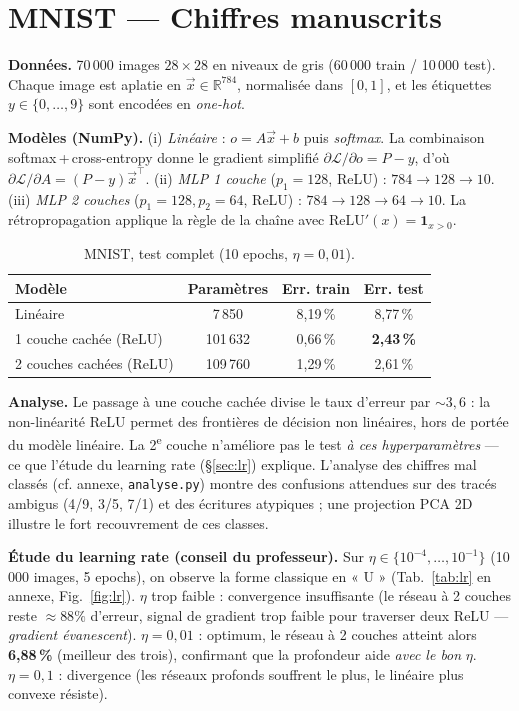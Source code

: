 \documentclass[11pt]{article}
\begin{document}
\section{MNIST --- Chiffres manuscrits}
\textbf{Données.} 70\,000 images $28\times28$ en niveaux de gris (60\,000 train / 10\,000 test).
Chaque image est aplatie en $\vec{x}\in\mathbb{R}^{784}$, normalisée dans $[0,1]$, et les étiquettes
$y\in\{0,\dots,9\}$ sont encodées en \emph{one-hot}.

\textbf{Modèles (NumPy).} (i) \emph{Linéaire} : $o=A\vec{x}+b$ puis \emph{softmax}. La combinaison
softmax\,+\,cross-entropy donne le gradient simplifié $\partial\mathcal{L}/\partial o = P-y$, d'où
$\partial\mathcal{L}/\partial A = (P-y)\vec{x}^{\top}$. (ii) \emph{MLP 1 couche} ($p_1=128$, ReLU) :
$784\!\to\!128\!\to\!10$. (iii) \emph{MLP 2 couches} ($p_1=128,p_2=64$, ReLU) :
$784\!\to\!128\!\to\!64\!\to\!10$. La rétropropagation applique la règle de la chaîne avec
$\mathrm{ReLU}'(x)=\mathbf{1}_{x>0}$.

\begin{table}[H]
\centering\small
\begin{tabular}{lccc}
\toprule
Modèle & Paramètres & Err. train & Err. test \\
\midrule
Linéaire & 7\,850 & 8,19\,\% & 8,77\,\% \\
1 couche cachée (ReLU) & 101\,632 & 0,66\,\% & \textbf{2,43\,\%} \\
2 couches cachées (ReLU) & 109\,760 & 1,29\,\% & 2,61\,\% \\
\bottomrule
\end{tabular}
\caption{MNIST, test complet (10 epochs, $\eta=0{,}01$).}
\label{tab:mnist}
\end{table}

\vspace{-0.25cm}
\textbf{Analyse.} Le passage à une couche cachée divise le taux d'erreur par $\sim 3{,}6$ : la
non-linéarité ReLU permet des frontières de décision non linéaires, hors de portée du modèle linéaire.
La 2\textsuperscript{e} couche n'améliore pas le test \emph{à ces hyperparamètres} --- ce que l'étude
du learning rate (\S\ref{sec:lr}) explique. L'analyse des chiffres mal classés (cf. annexe,
\texttt{analyse.py}) montre des confusions attendues sur des tracés ambigus (4/9, 3/5, 7/1) et des
écritures atypiques ; une projection PCA 2D illustre le fort recouvrement de ces classes.

\textbf{Étude du learning rate (conseil du professeur).}\label{sec:lr}
Sur $\eta\in\{10^{-4},\dots,10^{-1}\}$ (10\,000 images, 5 epochs), on observe la forme classique en
« U » (Tab.~\ref{tab:lr} en annexe, Fig.~\ref{fig:lr}). $\eta$ trop faible : convergence insuffisante
(le réseau à 2 couches reste $\approx 88\%$ d'erreur, signal de gradient trop faible pour traverser
deux ReLU --- \emph{gradient évanescent}). $\eta=0{,}01$ : optimum, le réseau à 2 couches atteint alors
\textbf{6,88\,\%} (meilleur des trois), confirmant que la profondeur aide \emph{avec le bon} $\eta$.
$\eta=0{,}1$ : divergence (les réseaux profonds souffrent le plus, le linéaire plus convexe résiste).
\end{document}
